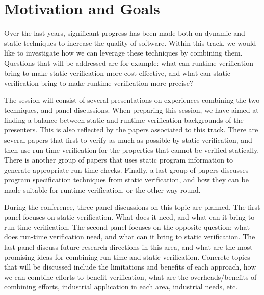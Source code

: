 
\section{Motivation and Goals}

Over the last years, significant progress has been made both on dynamic and static techniques to increase the quality of software. Within this track, we would like to investigate how we can leverage these techniques by combining them. Questions that will be addressed are for example: what can runtime verification bring to make static verification more cost effective, and what can static verification bring to make runtime verification more precise? 

The session will consist of several presentations on experiences combining the two techniques, and panel discussions. When preparing this session, we have aimed at finding a balance between static and runtime verification backgrounds of the presenters. This is also reflected by the papers associated to this track. There are several papers that first to verify as much as possible by static verification, and then use run-time verification for the properties that cannot be verified statically. There is another group of papers that uses static program information to generate appropriate run-time checks. Finally, a last group of papers discusses program specification techniques from static verification, and how they can be made suitable for runtime verification, or the other way round.

During the conference, three panel discussions on this topic are planned. The first panel focuses on static verification. What does it need, and what can it bring to run-time verification. The second panel focuses on the opposite question: what does run-time verification need, and what can it bring to static verification. The last panel  discuss future research directions in this area, and what are the most promising ideas for combining run-time and static verification. Concrete topics that will be discussed include the limitations and benefits of each approach, how we can combine efforts to benefit verification, what are the overheads/benefits of combining efforts, industrial application in each area, industrial needs, etc.



